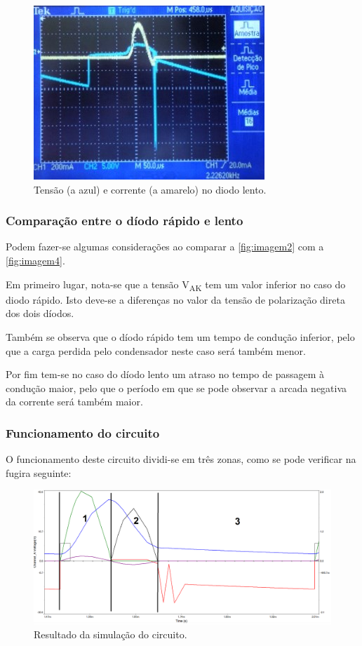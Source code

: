 \documentclass[a4paper,11pt]{article}
\numberwithin{equation}{section}
\begin{document}
\begin{figure}[h]
	\centering
	\includegraphics[keepaspectratio=true, scale=1.19]{img/imagem4}
	\caption{Tensão (a azul) e corrente (a amarelo) no diodo lento.}
	\label{fig:imagem4}
	\vspace{-0.8em}
\end{figure}

\subsubsection{Comparação entre o díodo rápido e lento}

Podem fazer-se algumas considerações ao comparar a \autoref{fig:imagem2} com a \autoref{fig:imagem4}.

Em primeiro lugar, nota-se que a tensão V\textsubscript{AK} tem um valor inferior no caso do diodo rápido. Isto deve-se a diferenças no valor da tensão de polarização direta dos dois díodos.

Também se observa que o díodo rápido tem um tempo de condução inferior, pelo que a carga perdida pelo condensador neste caso será também menor.

Por fim tem-se no caso do díodo lento um atraso no tempo de passagem à condução maior, pelo que o período em que se pode observar a arcada negativa da corrente será também maior.

\subsubsection{Funcionamento do circuito}
O funcionamento deste circuito dividi-se em três zonas, como se pode verificar na fugira seguinte:

\begin{figure}[h]
	\centering
	\includegraphics[keepaspectratio=true, scale=0.4]{img/funcionamento_tir}
	\caption{Resultado da simulação do circuito.}
	\label{fig:figura 1}
	\vspace{-0.8em}
\end{figure}
\end{document}
